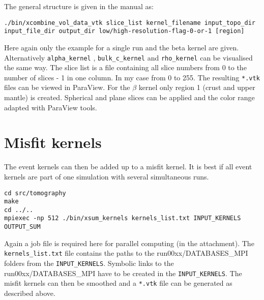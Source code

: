 The general structure is given in the manual as:
\begin{lstlisting} 
./bin/xcombine_vol_data_vtk slice_list kernel_filename input_topo_dir input_file_dir output_dir low/high-resolution-flag-0-or-1 [region]
\end{lstlisting}

Here again only the example for a single run and the beta kernel are given. 
Alternatively \texttt{alpha\_kernel} , \texttt{bulk\_c\_kernel} and \texttt{rho\_kernel} can be visualised the same way.
The slice list is a file containing all slice numbers from 0 to the 
number of slices - 1 in one column. In my case from 0 to 255.
The resulting \texttt{*.vtk} files can be viewed in ParaView.
For the $\beta$ kernel only region 1 (crust and upper mantle) is created.
Spherical and plane slices can be applied and the color range adapted 
with ParaView tools.

\section{Misfit kernels}

The event kernels can then be added up to a misfit kernel.
It is best if all event kernels are part of one simulation with
several simultaneous runs.

\begin{lstlisting} 
cd src/tomography
make
cd ../..
mpiexec -np 512 ./bin/xsum_kernels kernels_list.txt INPUT_KERNELS OUTPUT_SUM
\end{lstlisting}

Again a job file is required here for parallel computing (in the attachment).
The \texttt{kernels\_list.txt} file contains the paths to the {run00xx/DATABASES\_MPI} folders from the \texttt{INPUT\_KERNELS}.
Symbolic links to the {run00xx/DATABASES\_MPI} have to be created in the
\texttt{INPUT\_KERNELS}.
The misfit kernels can then be smoothed and a \texttt{*.vtk} file can be 
generated as described above.
